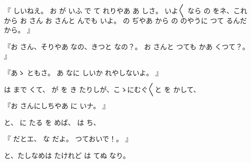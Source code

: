『
しいねえ。
お
が
いふ
で
て
れりやあ
あ
しさ。
いよ〳〵
なら
の
をネ、これから
お
さん
お
さんと
んでも
いよ。
の
ぢやあ
から
の
のやうに
つて
るんだから。
』

『お
さん、そりやあ
なの、きつと
なの？。
お
さんと
つても
かあ
くつて？。
』

『あゝ
ともさ。
あ
なに
しいか
れやしないよ。
』

は
まで
くて、
が
を
き
たりしが、こゝにむぐ〳〵と
を
かして、

『お
さんにしちやあ
に
いナ。
』

と、
に
たる
を
めば、
は
ち、

『
だとエ、
な
だよ。
つておいで！。
』

と、たしなめは
たけれど
は
てぬ
なり。

